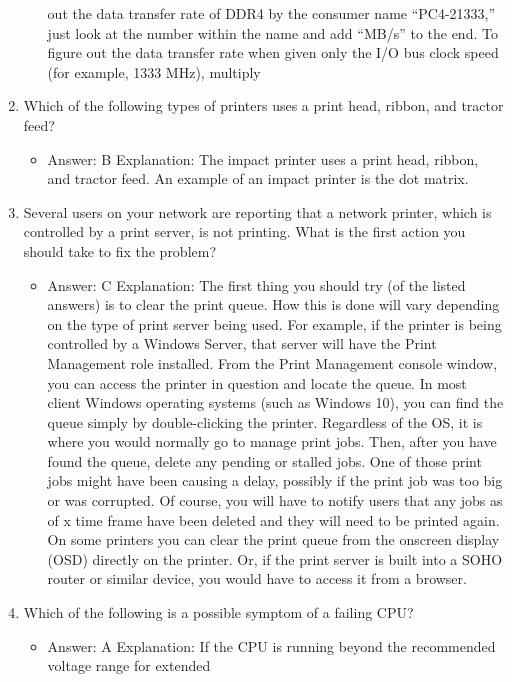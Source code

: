 \documentclass{article}
\begin{document}
\begin{enumerate}
\begin{itemize}
out the data transfer rate of DDR4 by the consumer name “PC4-21333,” just look at
the number within the name and add “MB/s” to the end. To figure out the data transfer
rate when given only the I/O bus clock speed (for example, 1333 MHz), multiply
    \end{itemize}
    \item Which of the following types of printers uses a print head, ribbon,
and tractor feed?
    \begin{itemize}
        \item Answer: B
Explanation: The impact printer uses a print head, ribbon, and tractor feed. An example
of an impact printer is the dot matrix.
    \end{itemize}
    \item Several users on your network are reporting that a network printer,
which is controlled by a print server, is not printing. What is the
first action you should take to fix the problem?
    \begin{itemize}
        \item Answer: C
Explanation: The first thing you should try (of the listed answers) is to clear the print
queue. How this is done will vary depending on the type of print server being used. For
example, if the printer is being controlled by a Windows Server, that server will have
the Print Management role installed. From the Print Management console window, you
can access the printer in question and locate the queue. In most client Windows operating
systems (such as Windows 10), you can find the queue simply by double-clicking
the printer. Regardless of the OS, it is where you would normally go to manage print
jobs. Then, after you have found the queue, delete any pending or stalled jobs. One of
those print jobs might have been causing a delay, possibly if the print job was too big
or was corrupted. Of course, you will have to notify users that any jobs as of x time
frame have been deleted and they will need to be printed again. On some printers you
can clear the print queue from the onscreen display (OSD) directly on the printer. Or, if
the print server is built into a SOHO router or similar device, you would have to access
it from a browser.
    \end{itemize}
    \item Which of the following is a possible symptom of a failing CPU?
    \begin{itemize}
        \item Answer: A
Explanation: If the CPU is running beyond the recommended voltage range for extended

\end{itemize}
\end{enumerate}
\end{document}
